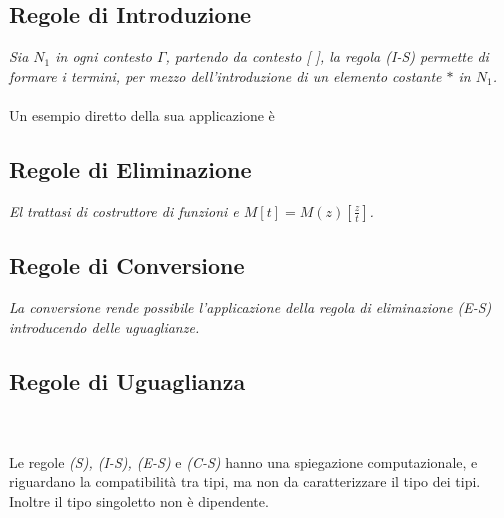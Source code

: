 \subsection{Regole di Introduzione}
\label{subsec:introduzione-singoletto}
\begin{prooftree}
\end{prooftree}
\textit{Sia $N_1$ in ogni contesto $\Gamma$, partendo da contesto [ ], la regola (I-S) permette di formare i termini, per mezzo dell'introduzione di un elemento costante $\ast$ in $N_1$.}\\\\
Un esempio diretto della sua applicazione \`e
\begin{prooftree}
\end{prooftree}

\subsection{Regole di Eliminazione}
\label{subsec:eliminazione-singoletto}
\begin{prooftree}
\end{prooftree}
\noindent
\textit{El trattasi di costruttore di funzioni e $M[t] = M(z)[\frac{z}{t}]$.}
\subsection{Regole di Conversione}
\label{subsec:conversione-singoletto}
\begin{prooftree}
\end{prooftree}
\textit{La conversione rende possibile l'applicazione della regola di eliminazione (E-S) introducendo delle uguaglianze.}

\subsection{Regole di Uguaglianza}
\label{subsec:uguaglianza-singoletto}
\begin{prooftree}
\end{prooftree}
\noindent
\\\\
Le regole \textit{(S), (I-S), (E-S)} e \textit{(C-S)}  hanno una spiegazione computazionale, e riguardano la compatibilit\`a tra tipi, ma non da caratterizzare il tipo dei tipi.\\ Inoltre il tipo singoletto non \`e dipendente.

